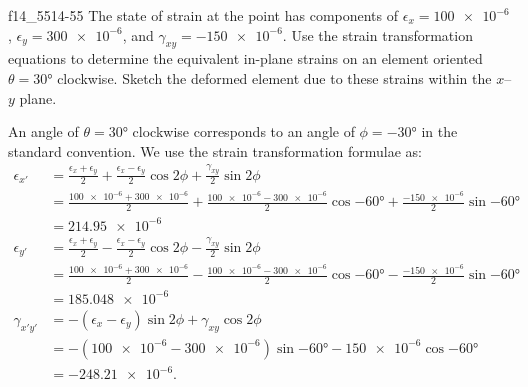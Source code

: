 
\begin{problemwithimage}{f14_55}{14-55}
  The state of strain at the point has components of $\epsilon_x = \num{100e-6}$, $\epsilon_y = \num{300e-6}$, and $\gamma_{xy} = \num{-150e-6}$.
  Use the strain transformation equations to determine the equivalent in-plane strains on an element oriented $\theta = \ang{30}$ clockwise.
  Sketch the deformed element due to these strains within the $x$--$y$ plane.
\end{problemwithimage}

\begin{derivation}
  An angle of $\theta = \ang{30}$ clockwise corresponds to an angle of $\phi = \ang{-30}$ in the standard convention.
  We use the strain transformation formulae as:
  \begin{align*}
    \epsilon_{x'} &= \frac{\epsilon_x + \epsilon_y}{2} + \frac{\epsilon_x - \epsilon_y}{2} \cos 2\phi + \frac{\gamma_{xy}}{2} \sin 2 \phi \\
           &= \frac{\num{100e-6}  + \num{300e-6}}{2} + \frac{\num{100e-6} - \num{300e-6}}{2} \cos \ang{-60}  + \frac{\num{-150e-6} }{2} \sin \ang{-60}  \\
           &= \num{214,95e-6}  \\
    \epsilon_{y'} &= \frac{\epsilon_x + \epsilon_y}{2} - \frac{\epsilon_x - \epsilon_y}{2} \cos 2\phi - \frac{\gamma_{xy}}{2} \sin 2\phi \\
                  &= \frac{\num{100e-6} + \num{300e-6} }{2} - \frac{\num{100e-6} - \num{300e-6} }{2} \cos \ang{-60} - \frac{\num{-150e-6}}{2} \sin \ang{-60} \\
                  &= \num{185,048e-6}  \\
    \gamma_{x'y'} &= - (\epsilon_x - \epsilon_y) \sin 2 \phi + \gamma_{xy} \cos 2\phi \\
    &= - \left( \num{100e-6} - \num{300e-6}  \right) \sin \ang{-60} - \num{150e-6} \cos \ang{-60}   \\
    &= \num{-248,21e-6} 
  .\end{align*}
\end{derivation}


